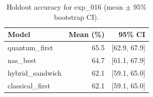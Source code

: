 \begin{table}[ht]
\centering
\caption{Holdout accuracy for exp_016 (mean $\pm$ 95\% bootstrap CI).}
\label{tab:exp_016}
\begin{tabular}{lrr}
\toprule
Model & Mean (\%) & 95\% CI \\
\midrule
quantum\_first & 65.5 & [62.9, 67.9] \\
nas\_best & 64.7 & [61.1, 67.9] \\
hybrid\_sandwich & 62.1 & [59.1, 65.0] \\
classical\_first & 62.1 & [59.1, 65.0] \\
\bottomrule
\end{tabular}
\end{table}
